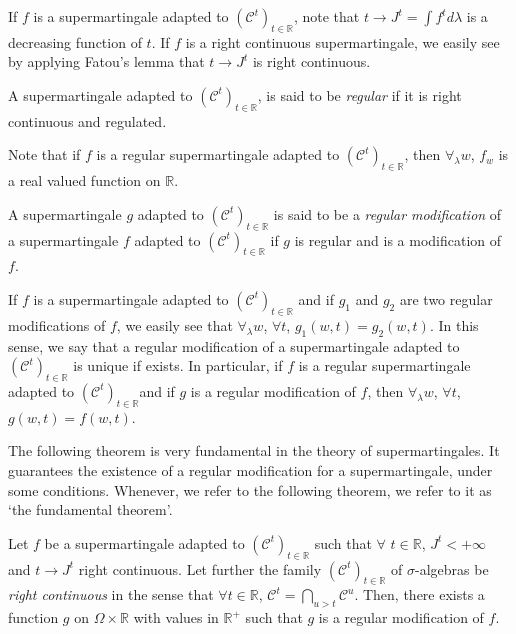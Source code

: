If $f$ is a supermartingale adapted to $(\mathscr{C}^t)_{t \in
  \mathbb{R}}$, note that $t \to J^t = \int f^t d \lambda$ is a
decreasing function of $t$. If $f$ is a right continuous
supermartingale, we easily see by applying Fatou's lemma that $t \to
J^t$ is right continuous. 

\begin{defn}\label{part2:chap4:def62}
A supermartingale adapted to $(\mathscr{C}^t)_{t\in \mathbb{R}}$, is
said to be {\em regular} if it is right continuous and regulated. 
\end{defn}

Note that if $f$ is a regular supermartingale adapted to
$(\mathscr{C}^t)_{t \in \mathbb{R}}$, then $\forall_\lambda w$, $f_w$
is a real valued function on $\mathbb{R}$. 

\begin{defn}\label{part2:chap4:def63}
A supermartingale $g$ adapted to $(\mathscr{C}^t)_{t \in \mathbb{R}}$
is said to be a {\em regular modification} of a supermartingale $f$
adapted to $(\mathscr{C}^t)_{t \in \mathbb{R}}$ if $g$ is regular and
is a modification of $f$. 
\end{defn}

\begin{rem}\label{part2:chap4:rem64}
If $f$ is a supermartingale adapted to $(\mathscr{C}^t)_{t \in
  \mathbb{R}}$ and if $g_1$ and $g_2$ are two regular modifications of
$f$, we easily see that $\forall_\lambda w$, $\forall t$, $g_1 (w,t) =
g_2 (w,t)$. In this sense, we say that a regular modification of a
supermartingale adapted to $(\mathscr{C}^t)_{t \in \mathbb{R}}$ is
unique if exists. In particular, if $f$ is a regular supermartingale
adapted to $(\mathscr{C}^t)_{t \in \mathbb{R}}$\pageoriginale and if
$g$ is a regular modification of $f$, then $\forall_\lambda w$,
$\forall t$, $g(w,t) = f(w,t)$. 
\end{rem}

The following theorem is very fundamental in the theory of
supermartingales. It guarantees the existence of a regular
modification for a  supermartingale, under some conditions. Whenever,
we refer to the following theorem, we refer to it as `the fundamental
theorem'.

\medskip
{} Let $f$ be a
supermartingale adapted to $(\mathscr{C}^t)_{t \in \mathbb{R}}$ such
that $\forall$ $t \in \mathbb{R}$, $J^t < + \infty$ and $t \to J^t$
right continuous. Let further the family $(\mathscr{C}^t)_{t \in
  \mathbb{R}}$ of $\sigma$-algebras be {\em right continuous} in the
sense that $\forall t \in \mathbb{R}$, $\mathscr{C}^t =
\bigcap\limits_{u > t} \mathscr{C}^u$. Then, there exists  a function
$g$ on $\Omega \times \mathbb{R}$ with values in $\mathbb{R}^+$ such
that $g$ is a regular modification of $f$. 

